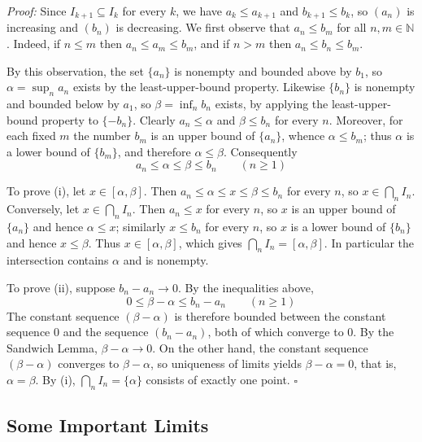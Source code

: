 \documentclass[a4paper,11pt,abstracton]{scrartcl}
\newcommand{\NN}{\mathbb{N}}
\theoremstyle{dotlessP}
\theoremstyle{dotlessS}
\theoremstyle{remark}
\theoremstyle{definition}
\begin{document}
\begin{claim_box}
\textit{Proof:}
Since $I_{k+1}\subseteq I_k$ for every $k$, we have $a_k\le a_{k+1}$ and $b_{k+1}\le b_k$, so $(a_n)$ is increasing and $(b_n)$ is decreasing. We first observe that $a_n\le b_m$ for all $n,m\in\NN$. Indeed, if $n\le m$ then $a_n\le a_m\le b_m$, and if $n>m$ then $a_n\le b_n\le b_m$.

By this observation, the set $\{a_n\}$ is nonempty and bounded above by $b_1$, so $\alpha=\sup_n a_n$ exists by the least-upper-bound property. Likewise $\{b_n\}$ is nonempty and bounded below by $a_1$, so $\beta=\inf_n b_n$ exists, by applying the least-upper-bound property to $\{-b_n\}$. Clearly $a_n\le\alpha$ and $\beta\le b_n$ for every $n$. Moreover, for each fixed $m$ the number $b_m$ is an upper bound of $\{a_n\}$, whence $\alpha\le b_m$; thus $\alpha$ is a lower bound of $\{b_m\}$, and therefore $\alpha\le\beta$. Consequently
\[
    a_n\le\alpha\le\beta\le b_n\qquad(n\ge1)
\]

To prove (i), let $x\in[\alpha,\beta]$. Then $a_n\le\alpha\le x\le\beta\le b_n$ for every $n$, so $x\in\bigcap_n I_n$. Conversely, let $x\in\bigcap_n I_n$. Then $a_n\le x$ for every $n$, so $x$ is an upper bound of $\{a_n\}$ and hence $\alpha\le x$; similarly $x\le b_n$ for every $n$, so $x$ is a lower bound of $\{b_n\}$ and hence $x\le\beta$. Thus $x\in[\alpha,\beta]$, which gives $\bigcap_n I_n=[\alpha,\beta]$. In particular the intersection contains $\alpha$ and is nonempty.

To prove (ii), suppose $b_n-a_n\to0$. By the inequalities above,
\[
    0\le\beta-\alpha\le b_n-a_n\qquad(n\ge1)
\]
The constant sequence $(\beta-\alpha)$ is therefore bounded between the constant sequence $0$ and the sequence $(b_n-a_n)$, both of which converge to $0$. By the Sandwich Lemma, $\beta-\alpha\to0$. On the other hand, the constant sequence $(\beta-\alpha)$ converges to $\beta-\alpha$, so uniqueness of limits yields $\beta-\alpha=0$, that is, $\alpha=\beta$. By (i), $\bigcap_n I_n=\{\alpha\}$ consists of exactly one point.
\hfill$\square$
\end{claim_box}

\subsection{Some Important Limits}
\end{document}
